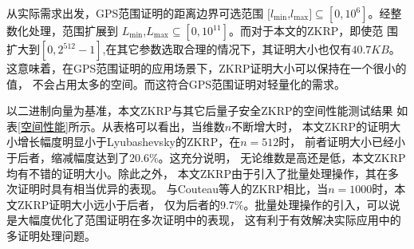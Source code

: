 \documentclass[zihao=-4]{ctexart}
\begin{document}
从实际需求出发，GPS范围证明的距离边界可选范围
$[l_{\min}$,$l_{\max}]\subseteq[0, 10^6]$。经整数化处理，范围扩展到
$L_{\min}$,$L_{\max}\subseteq[0, 10^{11}]$。而对于本文的ZKRP，即使范
围扩大到$[0, 2^{512}-1]$,在其它参数选取合理的情况下，其证明大小也仅有$40.7KB$。
这意味着，在GPS范围证明的应用场景下，ZKRP证明大小可以保持在一个很小的值，
不会占用太多的空间。而这符合GPS范围证明对轻量化的需求。\par
以二进制向量为基准，本文ZKRP与其它后量子安全ZKRP的空间性能测试结果
如表\ref{空间性能}所示。从表格可以看出，当维数$n$不断增大时，
本文ZKRP的证明大小增长幅度明显小于Lyubashevsky的ZKRP\cite{Thirty-five}，在$n=512$时，
前者证明大小已经小于后者，缩减幅度达到了$20.6 \% $。这充分说明，
无论维数是高还是低，本文ZKRP均有不错的证明大小。除此之外，
本文ZKRP由于引入了批量处理操作，其在多次证明时具有相当优异的表现。
与Couteau等人\cite{seventeen}的ZKRP相比，当$n=1000$时，本文ZKRP证明大小远小于后者，
仅为后者的$9.7\%$。批量处理操作的引入，可以说是大幅度优化了范围证明在多次证明中的表现，
这有利于有效解决实际应用中的多证明处理问题。
\end{document}
